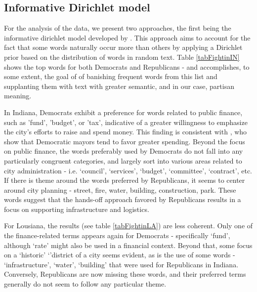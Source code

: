 \documentclass[11pt]{article}
\begin{document}
\subsection{Informative Dirichlet model}

For the analysis of the data, we present two approaches, the first being the informative dirichlet model developed by \citep{Monroe2008}. This approach aims to account for the fact that some words naturally occur more than others by applying a Dirichlet prior based on the distribution of words in random text. Table \ref{tabFightinIN} shows the top words for both Democrats and Republicans - and accomplishes, to some extent, the goal of \citep{Monroe2008} of banishing frequent words from this list and supplanting them with text with greater semantic, and in our case, partisan meaning. 

In Indiana, Democrats exhibit a preference for words related to public finance, such as 'fund', 'budget', or 'tax', indicative of a greater willingness to emphasize the city's efforts to raise and spend money. This finding is consistent with \citep{Einstein2015}, who show that Democratic mayors tend to favor greater spending. Beyond the focus on public finance, the words preferably used by Democrats do not fall into any particularly congruent categories, and largely sort into various areas related to city administration - i.e. `council', `services', `budget', `committee', `contract', etc. If there is theme around the words preferred by Republicans, it seems to center around city planning - street, fire, water, building, construction, park. These words suggest that the hands-off approach favored by Republicans results in a focus on supporting infrastructure and logistics.


For Lousiana, the results (see table \ref{tabFightinLA}) are less coherent. Only one of the finance-related terms appears again for Democrats - specifically `fund', although `rate' might also be used in a financial context. Beyond that, some focus on a `historic' `'district of a city seems evident, as is the use of some words - `infrastructure', `water', `building' that were used for Republicans in Indiana. Conversely, Republicans are now missing these words, and their preferred terms generally do not seem to follow any particular theme.
\end{document}
